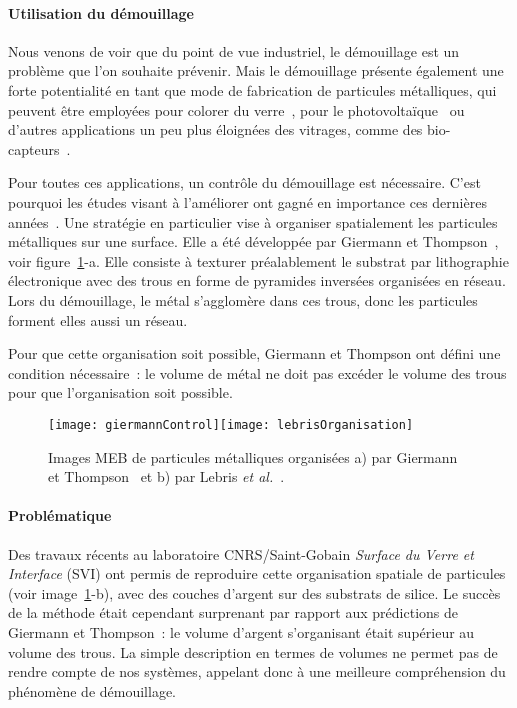 \paragraph*{Utilisation du démouillage\newline}
Nous venons de voir que du point de vue industriel, le démouillage est un problème que l'on souhaite prévenir. Mais le démouillage présente également une forte potentialité en tant que mode de fabrication de particules métalliques, qui peuvent être employées pour colorer du verre~\cite{freestone2007lycurgus}, pour le photovoltaïque~\cite{morawiec2013self, atwater2010plasmonics} ou d'autres applications un peu plus éloignées des vitrages, comme des bio-capteurs~\cite{grochowska2016properties}.\par 
Pour toutes ces applications, un contrôle du démouillage est nécessaire. C'est pourquoi les études visant à l'améliorer ont gagné en importance ces dernières années~\cite{thompson2012solid}. Une stratégie en particulier vise à organiser spatialement les particules métalliques sur une surface. Elle a été développée par Giermann et Thompson~\cite{giermann2005solid}, voir figure~\ref{MEBorganisation}-a. Elle consiste à texturer préalablement le substrat par lithographie électronique avec des trous en forme de pyramides inversées organisées en réseau. Lors du démouillage, le métal s'agglomère dans ces trous, donc les particules forment elles aussi un réseau.\par 
Pour que cette organisation soit possible, Giermann et Thompson ont défini une condition nécessaire~: le volume de métal ne doit pas excéder le volume des trous pour que l'organisation soit possible.\par 
 \begin{figure}[!htb]
\centering
\texttt{[image: giermannControl]}\texttt{[image: lebrisOrganisation]}
\caption{Images MEB de particules métalliques organisées a) par Giermann et Thompson~\cite{giermann2005solid} et b) par Lebris \textit{et al.}~\cite{le2014self}.}
\label{MEBorganisation}
\end{figure}

\paragraph*{Problématique\newline}
Des travaux récents au laboratoire CNRS/Saint-Gobain \textit{Surface du Verre et Interface} (SVI) ont permis de reproduire cette organisation spatiale de particules (voir image~\ref{MEBorganisation}-b), avec des couches d'argent sur des substrats de silice. Le succès de la méthode était cependant surprenant par rapport aux prédictions de Giermann et Thompson~: le volume d'argent s'organisant était supérieur au volume des trous. La simple description en termes de volumes ne permet pas de rendre compte de nos systèmes, appelant donc à une meilleure compréhension du phénomène de démouillage.

